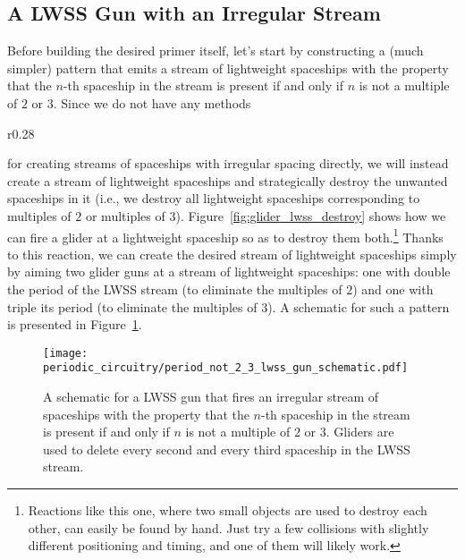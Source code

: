 \subsection{A LWSS Gun with an Irregular Stream}\label{sec:primer_irregular_stream}

Before building the desired primer itself, let's start by constructing a (much simpler) pattern that emits a stream of lightweight spaceships with the property that the $n$-th spaceship in the stream is present if and only if $n$ is not a multiple of $2$ or $3$. Since we do not have any methods
\begin{wrapfigure}{r}{0.28\textwidth}
	\centering
	\caption{A glider and an LWSS destroying each other.}\label{fig:glider_lwss_destroy}
\end{wrapfigure}
for creating streams of spaceships with irregular spacing directly, we will instead create a stream of lightweight spaceships and strategically destroy the unwanted spaceships in it (i.e., we destroy all lightweight spaceships corresponding to multiples of $2$ or multiples of $3$). Figure~\ref{fig:glider_lwss_destroy} shows how we can fire a glider at a lightweight spaceship so as to destroy them both.\footnote{Reactions like this one, where two small objects are used to destroy each other, can easily be found by hand. Just try a few collisions with slightly different positioning and timing, and one of them will likely work.} Thanks to this reaction, we can create the desired stream of lightweight spaceships simply by aiming two glider guns at a stream of lightweight spaceships: one with double the period of the LWSS stream (to eliminate the multiples of $2$) and one with triple its period (to eliminate the multiples of $3$). A schematic for such a pattern is presented in Figure~\ref{fig:period_not_2_3_lwss_gun_schematic}. 

\begin{figure}[!htb]
	\centering
	\texttt{[image: periodic\_circuitry/period\_not\_2\_3\_lwss\_gun\_schematic.pdf]}
	\caption{A schematic for a LWSS gun that fires an irregular stream of spaceships with the property that the $n$-th spaceship in the stream is present if and only if $n$ is not a multiple of $2$ or $3$. Gliders are used to delete every second and every third spaceship in the LWSS stream.}
	\label{fig:period_not_2_3_lwss_gun_schematic}
\end{figure}

